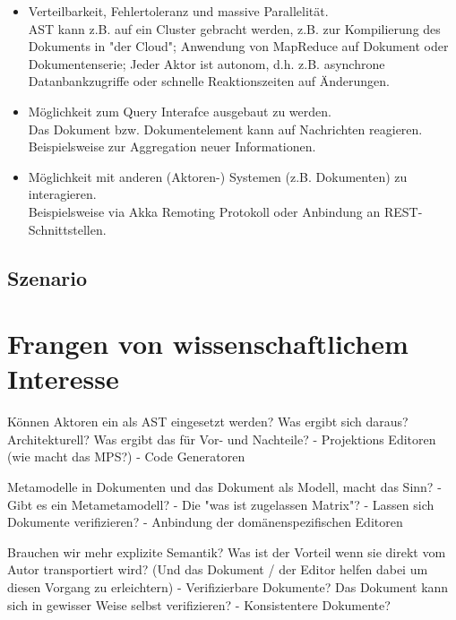 \begin{itemize}
  \item Verteilbarkeit, Fehlertoleranz und massive Parallelität.\\
        AST kann z.B. auf ein Cluster gebracht werden, z.B. zur Kompilierung des Dokuments in "der Cloud"; Anwendung von MapReduce auf Dokument oder Dokumentenserie; Jeder Aktor ist autonom, d.h. z.B. asynchrone Datanbankzugriffe oder schnelle Reaktionszeiten auf Änderungen.
  \item Möglichkeit zum Query Interafce ausgebaut zu werden.\\
        Das Dokument bzw. Dokumentelement kann auf Nachrichten reagieren. Beispielsweise zur Aggregation neuer Informationen.
  \item Möglichkeit mit anderen (Aktoren-) Systemen (z.B. Dokumenten) zu interagieren.\\
        Beispielsweise via Akka Remoting Protokoll oder Anbindung an REST-Schnittstellen.
\end{itemize}


\subsection{Szenario}

\section{Frangen von wissenschaftlichem Interesse}

Können Aktoren ein als AST eingesetzt werden?
Was ergibt sich daraus? Architekturell? Was ergibt das für Vor- und Nachteile?
  - Projektions Editoren (wie macht das MPS?)
  - Code Generatoren

Metamodelle in Dokumenten und das Dokument als Modell, macht das Sinn?
  - Gibt es ein Metametamodell?
  - Die "was ist zugelassen Matrix"?
  - Lassen sich Dokumente verifizieren?
  - Anbindung der domänenspezifischen Editoren

Brauchen wir mehr explizite Semantik? Was ist der Vorteil wenn sie direkt
vom Autor transportiert wird? (Und das Dokument / der Editor helfen dabei
um diesen Vorgang zu erleichtern)
  - Verifizierbare Dokumente? Das Dokument kann sich in gewisser Weise selbst verifizieren?
  - Konsistentere Dokumente?

